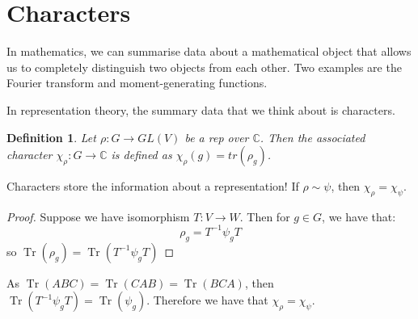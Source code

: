 \documentclass[]{report}
\newtheorem{definition}[theorem]{Definition}
\theoremstyle{definition}
\numberwithin{theorem}{section}
\numberwithin{equation}{section}
\newcommand{\tr}{\operatorname{Tr}}
\begin{document}
\section{Characters}
In mathematics, we can summarise data about a mathematical object that allows us to completely distinguish two objects from each other. Two examples are the Fourier transform and moment-generating functions. 

In representation theory, the summary data that we think about is characters.

\begin{definition}
	Let $\rho : G \rightarrow GL(V)$ be a rep over $\mathbb{C}$. Then the associated character $\chi_\rho : G \rightarrow \mathbb{C}$ is defined as $\chi_\rho(g) = tr(\rho_g)$. 
\end{definition}
Characters store the information about a representation!
If $\rho \sim \psi$, then $\chi_\rho = \chi_\psi$. 
\begin{proof}
	Suppose we have isomorphism $T: V \rightarrow W$. Then for $g \in G$, we have that:
	\begin{equation}
		\rho_g = T^{-1} \psi_g T
	\end{equation}
	so $\tr(\rho_g) = \tr(T^{-1} \psi_g T)$
\end{proof}
As $\tr(A B C) = \tr(C A B) = \tr(B C A)$, then $\tr(T^{-1} \psi_g T) = \tr(\psi_g)$. Therefore we have that $\chi_\rho = \chi_\psi$. 
\end{document}

